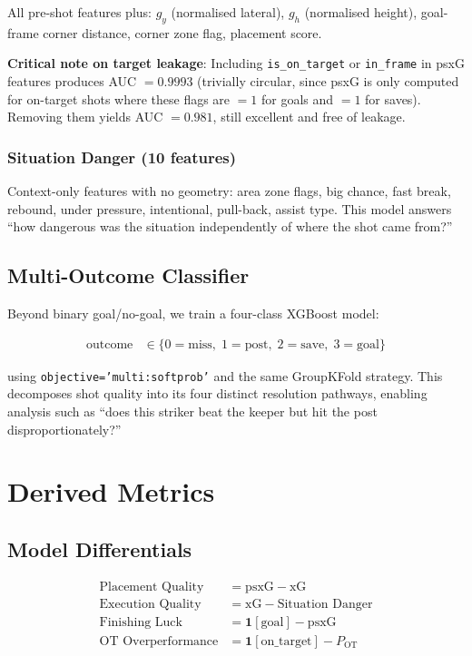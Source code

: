 \documentclass[12pt,a4paper]{article}
\begin{document}
All pre-shot features plus: $g_y$ (normalised lateral), $g_h$ (normalised height), goal-frame corner distance, corner zone flag, placement score.

\textbf{Critical note on target leakage}: Including \texttt{is\_on\_target} or \texttt{in\_frame} in psxG features produces AUC $= 0.9993$ (trivially circular, since psxG is only computed for on-target shots where these flags are $=1$ for goals and $=1$ for saves). Removing them yields AUC $= 0.981$, still excellent and free of leakage.

\subsubsection{Situation Danger (10 features)}

Context-only features with no geometry: area zone flags, big chance, fast break, rebound, under pressure, intentional, pull-back, assist type. This model answers ``how dangerous was the situation independently of where the shot came from?''

\subsection{Multi-Outcome Classifier}

Beyond binary goal/no-goal, we train a four-class XGBoost model:

\begin{align}
\text{outcome} &\in \{0=\text{miss},\; 1=\text{post},\; 2=\text{save},\; 3=\text{goal}\}
\end{align}

using \texttt{objective='multi:softprob'} and the same GroupKFold strategy. This decomposes shot quality into its four distinct resolution pathways, enabling analysis such as ``does this striker beat the keeper but hit the post disproportionately?''

\section{Derived Metrics}
\label{sec:derived}

\subsection{Model Differentials}

\begin{align}
\text{Placement Quality} &= \text{psxG} - \text{xG} \label{eq:pq} \\[4pt]
\text{Execution Quality} &= \text{xG} - \text{Situation Danger} \label{eq:eq} \\[4pt]
\text{Finishing Luck} &= \mathbf{1}[\text{goal}] - \text{psxG} \label{eq:fl} \\[4pt]
\text{OT Overperformance} &= \mathbf{1}[\text{on\_target}] - P_{\text{OT}} \label{eq:ot}
\end{align}
\end{document}
